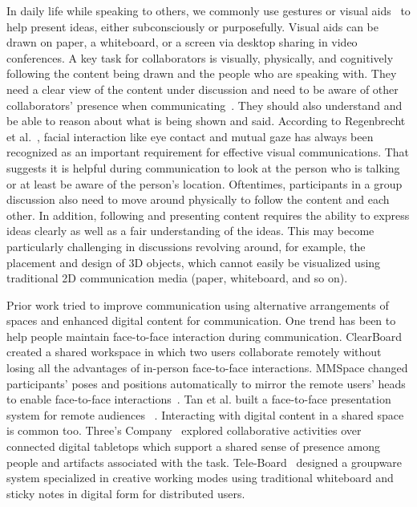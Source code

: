 \documentclass[chi_draft]{sigchi}
\begin{document}
In daily life while speaking to others, we commonly use gestures or visual aids~\cite{tversky2003human} to help present ideas, either subconsciously or purposefully. Visual aids can be drawn on paper, a whiteboard\cite{cherubini2007let}, or a screen via desktop sharing in video conferences.
A key task for collaborators is visually, physically, and cognitively following the content being drawn and the people who are speaking with. They need a clear view of the content under discussion and need to be aware of other collaborators' presence when communicating~\cite{ishii1992clearboard}. They should also understand and be able to reason about what is being shown and said.
According to Regenbrecht et al.~\cite{regenbrecht2015mutual}, facial interaction like eye contact and mutual gaze has always been recognized as an important requirement for effective visual communications. That suggests it is helpful during communication to look at the person who is talking or at least be aware of the person's location. 
Oftentimes, participants in a group discussion also need to move around physically to follow the content and each other. In addition, following and presenting content requires the ability to express ideas clearly as well as a fair understanding of the ideas. This may become particularly challenging in discussions revolving around, for example, the placement and design of 3D objects, which cannot easily be visualized using traditional 2D communication media (paper, whiteboard, and so on).


Prior work tried to improve communication using alternative arrangements of spaces and enhanced digital content for communication. One trend has been to help people maintain face-to-face interaction during communication. ClearBoard~\cite{ishii1993integration} created a shared workspace in which two users collaborate remotely without losing all the advantages of in-person face-to-face interactions. MMSpace changed participants' poses and positions automatically to mirror the remote users' heads to enable face-to-face interactions~\cite{otsuka2016mmspace}. Tan et al. built a face-to-face presentation system for remote audiences ~\cite{gazeAwareness}. Interacting with digital content in a shared space is common too. Three's Company~\cite{tang2010three} explored collaborative activities over connected digital tabletops which support a shared sense of presence among people and artifacts associated with the task. Tele-Board~\cite{gumienny2011tele} designed a groupware system specialized in creative working modes using traditional whiteboard and sticky notes in digital form for distributed users.
\end{document}
